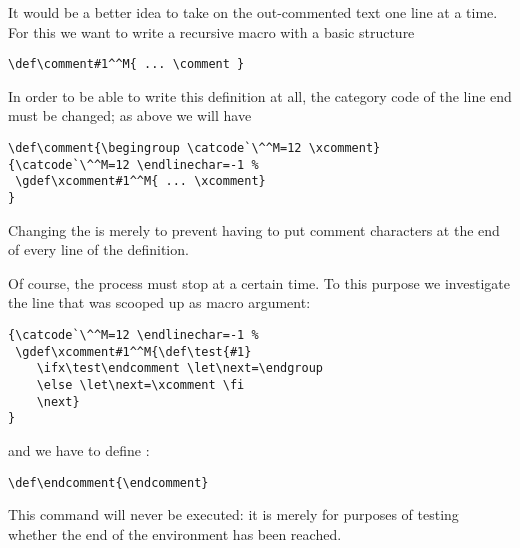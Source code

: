 It would be a better idea to take on the out-commented
text one line at a time. For this we want to write
a recursive macro with a basic structure
\begin{verbatim}
\def\comment#1^^M{ ... \comment }
\end{verbatim}
In order to be able to write this definition at all,
the category code of the line end must be changed; as above
\altt
we will have
\begin{verbatim}
\def\comment{\begingroup \catcode`\^^M=12 \xcomment}
{\catcode`\^^M=12 \endlinechar=-1 %
 \gdef\xcomment#1^^M{ ... \xcomment}
}
\end{verbatim}
Changing the  is merely to 
prevent having to put comment characters at the end
of every line of the definition.

Of course, the process must stop at a certain time.
To this purpose we investigate the line that was
scooped up as macro argument:
\begin{verbatim}
{\catcode`\^^M=12 \endlinechar=-1 %
 \gdef\xcomment#1^^M{\def\test{#1}
    \ifx\test\endcomment \let\next=\endgroup
    \else \let\next=\xcomment \fi
    \next}
}
\end{verbatim}
and we have to define :
\begin{verbatim}
\def\endcomment{\endcomment}
\end{verbatim}
This command will never be executed: it is merely for purposes
of testing whether the end of the environment has been reached.

